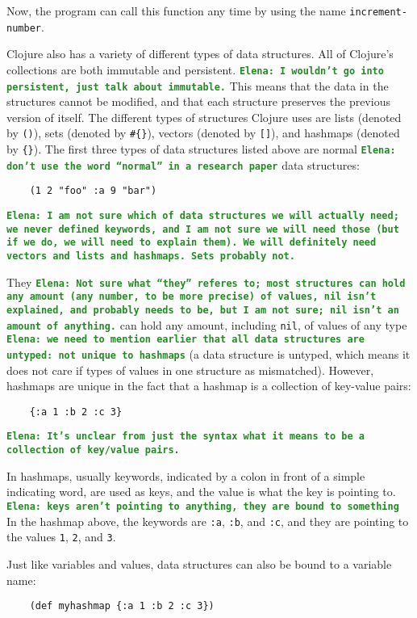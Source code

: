 \documentclass[12pt]{article}
\newcommand{\comment}[1]{{\bf \tt  {#1}}}
\newcommand{\emcomment}[1]{\textcolor{ForestGreen}{\comment{Elena: {#1}}}}
\begin{document}
Now, the program can call this function any time by using the name \texttt{increment-number}.

Clojure also has a variety of different types of data structures. All
of Clojure's collections are both immutable and persistent. 
\emcomment{I wouldn't go into persistent, just talk about immutable.}
This means
that the data in the structures cannot be modified, and that each
structure preserves the previous version of itself. The different
types of structures Clojure uses are lists (denoted by \texttt{()}),
sets (denoted by \texttt{\#\{\}}), vectors (denoted by \texttt{[]}),
and hashmaps (denoted by \texttt{\{\}}). The first three types of data
structures listed above are normal \emcomment{don't use the word
  ``normal'' in a research paper} data structures: 
\begin{verbatim}
	(1 2 "foo" :a 9 "bar")
\end{verbatim}
\emcomment{I am not sure which of data structures we will actually need; we
  never defined keywords, and I am not sure we will need those (but if
  we do, we will need to explain them). We will definitely need
  vectors and lists and hashmaps. Sets probably not.}

They \emcomment{Not sure what ``they'' referes to; most structures can
hold any amount (any number, to be more precise) of values, nil isn't
explained, and probably needs to 
be, but I am not sure; nil isn't an amount of anything.} can hold any
amount, including \texttt{nil}, of values of any 
type 
\emcomment{we need to mention earlier that all data structures are
  untyped: not unique to hashmaps}
(a data structure is untyped, which means it does not care if
types of values in one structure as mismatched). However, hashmaps are
unique in the fact that a hashmap is a collection of key-value pairs: 
\begin{verbatim}
	{:a 1 :b 2 :c 3}
\end{verbatim}
\emcomment{It's unclear from just the syntax what it means to be a
  collection of key/value pairs.}

In hashmaps, usually keywords, indicated by a colon in front of a
simple indicating word, are used as keys, and the value is what the
key is pointing to. 
\emcomment{keys aren't pointing to anything, they are bound to something}
In the hashmap above, the keywords are
\texttt{:a}, \texttt{:b}, and \texttt{:c}, and they are pointing to
the values \texttt{1}, \texttt{2}, and \texttt{3}. 

Just like variables and values, data structures can also be bound to a
variable name: 
\begin{verbatim}
	(def myhashmap {:a 1 :b 2 :c 3})
\end{verbatim}
\end{document}
